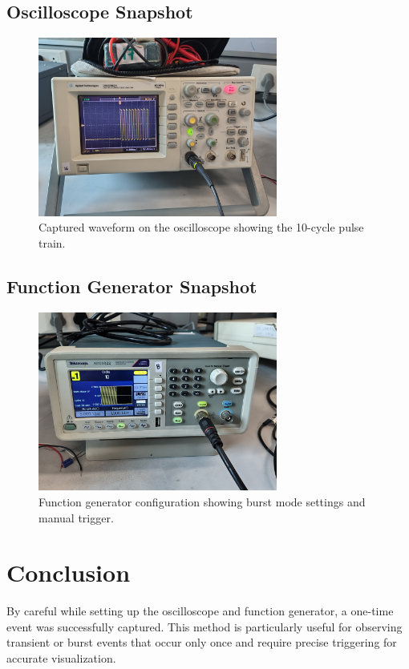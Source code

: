 \documentclass[12pt]{article}
\begin{document}
\subsection*{Oscilloscope Snapshot}
\begin{figure}[H]
    \centering
    \includegraphics[width=0.7\textwidth]{figs/Experiment-2/1.2.1.jpg}
    \caption{Captured waveform on the oscilloscope showing the 10-cycle pulse train.}
    \label{fig:oscilloscope}
\end{figure}

\subsection*{Function Generator Snapshot}
\begin{figure}[H]
    \centering
    \includegraphics[width=0.7\textwidth]{figs/Experiment-2/1.2.2.jpg}
    \caption{Function generator configuration showing burst mode settings and manual trigger.}
    \label{fig:function_generator}
\end{figure}
\section*{Conclusion}
By careful while setting up the oscilloscope and function generator, a one-time event was successfully captured. This method is particularly useful for observing transient or burst events that occur only once and require precise triggering for accurate visualization.
\end{document}
